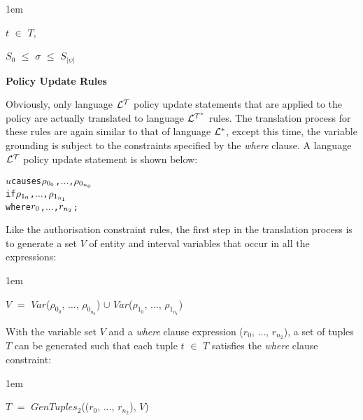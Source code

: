 \documentclass[11pt]{report}
\newenvironment{vverbatim}
{
  \begin{alltt}
}
{
  \vspace{-\baselineskip}
  \end{alltt}
}
\newenvironment{vquote}
{
  \begin{list}{}{\leftmargin 1em}\item[]
}
{
  \end{list}
}
\begin{document}
\begin{itemize}
\begin{vquote}
                \hspace{1em}
                $t$ $\in$ $T$,

                \hspace{1em}
                $S_{0}$ $\leq$ $\sigma$ $\leq$ $S_{|\psi|}$
              \end{vquote}

            \item
              {\bf Policy Update Rules}

              Obviously, only language ${\cal L^T}$ policy update statements
              that are applied to the policy are actually translated to
              language ${\cal L^{T^*}}$ rules. The translation process for
              these rules are again similar to that of language ${\cal L^*}$,
              except this time, the variable grounding is subject to the
              constraints specified by the {\em where} clause. A language
              ${\cal L^T}$ policy update statement is shown below:

              \begin{vverbatim}
  \(u\) causes \(\rho\sb{0\sb{0}}\), \(\ldots\), \(\rho\sb{0\sb{n\sb{0}}}\)
    if \(\rho\sb{1\sb{0}}\), \(\ldots\), \(\rho\sb{1\sb{n\sb{1}}}\)
    where \(r\sb{0}\), \(\ldots\), \(r\sb{n\sb{2}}\);
              \end{vverbatim}

              \noindent
              Like the authorisation constraint rules, the first step in the
              translation process is to generate a set $V$ of entity and
              interval variables that occur in all the expressions:

              \begin{vquote}
                $V$ $=$
                $Var$($\rho_{0_0}$, $\ldots$, $\rho_{0_{n_0}}$) $\cup$
                $Var$($\rho_{1_0}$, $\ldots$, $\rho_{1_{n_1}}$)
              \end{vquote}

              \noindent
              With the variable set $V$ and a {\em where} clause expression
              ($r_0$, $\ldots$, $r_{n_2}$), a set of tuples $T$ can be
              generated such that each tuple $t$ $\in$ $T$ satisfies the
              {\em where} clause constraint:

              \begin{vquote}
                $T$ $=$
                $GenTuples_2$(($r_0$, $\ldots$, $r_{n_2}$), $V$)
              \end{vquote}


\end{itemize}
\end{document}
